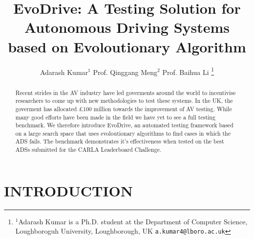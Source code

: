 \documentclass[a4paper, 10pt, conference]{ieeeconf}
\title{\LARGE \bf
EvoDrive: A Testing Solution for Autonomous Driving Systems based on Evoloutionary Algorithm
}
\author{Adarash Kumar$^{1}$ Prof. Qinggang Meng$^{2}$ Prof. Baihua Li %
\thanks{$^{1}$Adarash Kumar is a Ph.D. student at the Department of Computer Science,
        Loughboroguh University, Loughborough, UK
        {\tt\small a.kumar4@lboro.ac.uk}}%
}
\begin{document}
\maketitle
\thispagestyle{empty}
\pagestyle{empty}


\begin{abstract}

   Recent strides in the AV industry have led goverments around the world to incentivise researchers to come up with new methodologies to test these systems. In the UK, the goverment has allocated £100 million towards the improvement of AV testing. While many good efforts have been made in the field we have yet to see a full testing benchmark. We therefore introduce EvoDrive, an automated testing framework based on a large search space that uses evoloutionary algorithms to find cases in which the ADS fails. The benchmark demonstrates it's effectiveness when tested on the best ADSs submitted for the CARLA Leaderboard Challenge.

\end{abstract}


\section{INTRODUCTION}
\end{document}

